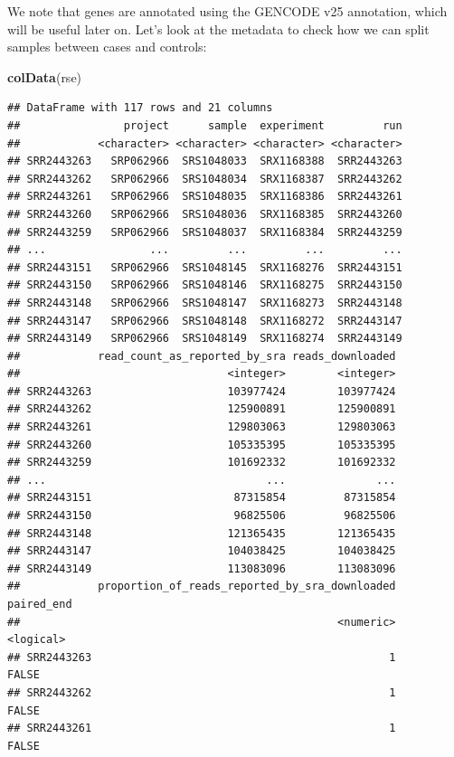 \documentclass[9pt,a4paper,]{extarticle}
\newenvironment{Shaded}{\begin{snugshade}}{\end{snugshade}}
\newcommand{\KeywordTok}[1]{\textcolor[rgb]{0.13,0.29,0.53}{\textbf{#1}}}
\newcommand{\NormalTok}[1]{#1}
\begin{document}
We note that genes are annotated using the GENCODE \citep{Harrow2012} v25 annotation, which will be useful later on.
Let's look at the metadata to check how we can split samples between cases and controls:

\begin{Shaded}
\begin{Highlighting}[]
\KeywordTok{colData}\NormalTok{(rse)}
\end{Highlighting}
\end{Shaded}

\begin{verbatim}
## DataFrame with 117 rows and 21 columns
##                project      sample  experiment         run
##            <character> <character> <character> <character>
## SRR2443263   SRP062966  SRS1048033  SRX1168388  SRR2443263
## SRR2443262   SRP062966  SRS1048034  SRX1168387  SRR2443262
## SRR2443261   SRP062966  SRS1048035  SRX1168386  SRR2443261
## SRR2443260   SRP062966  SRS1048036  SRX1168385  SRR2443260
## SRR2443259   SRP062966  SRS1048037  SRX1168384  SRR2443259
## ...                ...         ...         ...         ...
## SRR2443151   SRP062966  SRS1048145  SRX1168276  SRR2443151
## SRR2443150   SRP062966  SRS1048146  SRX1168275  SRR2443150
## SRR2443148   SRP062966  SRS1048147  SRX1168273  SRR2443148
## SRR2443147   SRP062966  SRS1048148  SRX1168272  SRR2443147
## SRR2443149   SRP062966  SRS1048149  SRX1168274  SRR2443149
##            read_count_as_reported_by_sra reads_downloaded
##                                <integer>        <integer>
## SRR2443263                     103977424        103977424
## SRR2443262                     125900891        125900891
## SRR2443261                     129803063        129803063
## SRR2443260                     105335395        105335395
## SRR2443259                     101692332        101692332
## ...                                  ...              ...
## SRR2443151                      87315854         87315854
## SRR2443150                      96825506         96825506
## SRR2443148                     121365435        121365435
## SRR2443147                     104038425        104038425
## SRR2443149                     113083096        113083096
##            proportion_of_reads_reported_by_sra_downloaded paired_end
##                                                 <numeric>  <logical>
## SRR2443263                                              1      FALSE
## SRR2443262                                              1      FALSE
## SRR2443261                                              1      FALSE

\end{verbatim}
\end{document}
